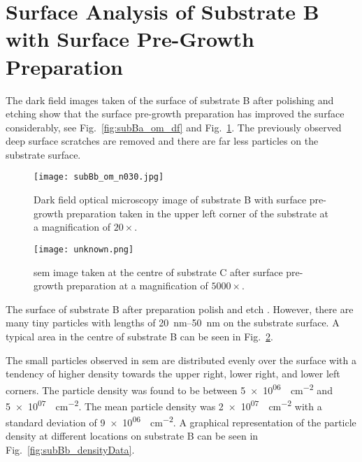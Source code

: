 \clearpage
\section[Surface Analysis of Substrate B with Surface Pre-Growth Preparation]{Surface Analysis of Substrate B with Surface Pre-Growth Preparation%
   }\label{sec:subBb}
   
The dark field images taken of the surface of substrate B after polishing and etching show that the surface pre-growth preparation has improved the surface considerably, see Fig.~\ref{fig:subBa_om_df} and Fig.~\ref{fig:subBb_om_df}. The previously observed deep surface scratches are removed and there are far less particles on the substrate surface.

\begin{figure}[htbp]
    \centering
    \texttt{[image: subBb\_om\_n030.jpg]}
    \caption[Dark field optical microscopy image of substrate B with surface pre-growth preparation.]{Dark field optical microscopy image of substrate B with surface pre-growth preparation taken in the upper left corner of the substrate at a magnification of $20\times$.}\label{fig:subBb_om_df}
\end{figure}
   
   
   
\begin{figure}[htbp]
    \centering
    \texttt{[image: unknown.png]}
    \caption[\Ac{sem} of the centre of substrate B with surface pre-growth preparation.]{\Acf{sem} image taken at the centre of substrate C after surface pre-growth preparation at a  magnification of $5000\times$.}
    \label{fig:subBb_sem_area}
\end{figure}

The surface of substrate B after preparation polish and etch \todo{}. However, there are many tiny particles with lengths of \SIrange{20}{50}{\nano\metre} on the substrate surface. A typical area in the centre of substrate B can be seen in Fig.~\ref{fig:subBb_sem_area}.

The small particles observed in \ac{sem} are distributed evenly over the surface with a tendency of higher density towards the upper right, lower right, and lower left corners. The particle density was found to be between \SI{5e+06}{\particle\centi\metre^{-2}} and \SI{5e+07}{\particle\centi\metre^{-2}}. The mean particle density was \SI{2e+07}{\particle\centi\metre^{-2}} with a standard deviation of \SI{9e+06}{\particle\centi\metre^{-2}}. A graphical representation of the particle density at different locations on substrate B can be seen in Fig.~\ref{fig:subBb_densityData}.


